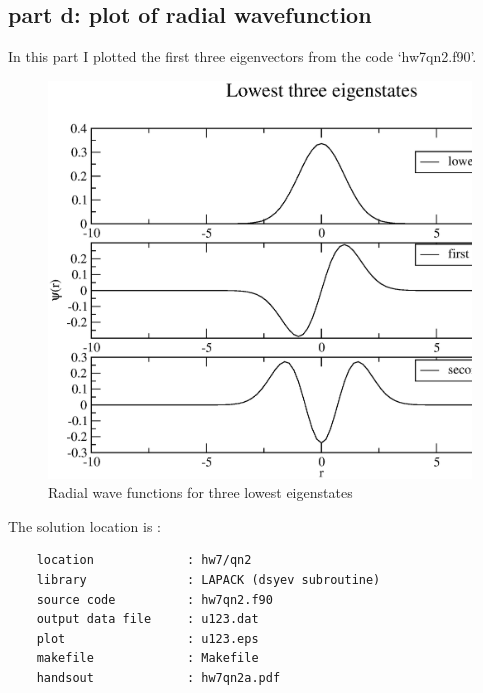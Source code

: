 \documentclass[11pt,a4paper,english]{article}
\begin{document}
	\subsection{part d: plot of radial wavefunction }
    In this part I plotted the first three eigenvectors from the code `hw7qn2.f90'.\\
	\begin{figure}[h!]
	\centering
	\includegraphics [scale=0.6]{u123.eps}
	\caption{Radial wave functions for three lowest eigenstates }
	\end{figure}
	\clearpage
    The solution location is :\\
	\begin{verbatim}
	location             : hw7/qn2
	library              : LAPACK (dsyev subroutine)
	source code          : hw7qn2.f90
	output data file     : u123.dat
	plot                 : u123.eps
	makefile             : Makefile
	handsout             : hw7qn2a.pdf
	\end{verbatim} 
\end{document}
